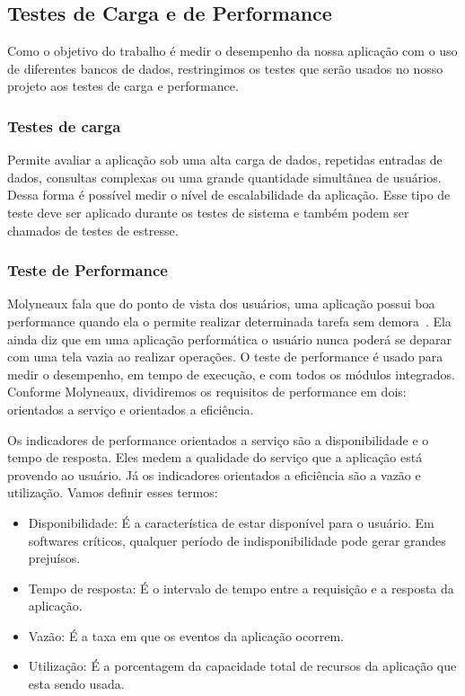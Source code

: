 \subsection{Testes de Carga e de Performance}

Como o objetivo do trabalho é medir o desempenho da nossa aplicação com o uso de diferentes bancos de dados, restringimos os testes que serão usados no nosso projeto aos testes de carga e performance.

\subsubsection{Testes de carga}

Permite avaliar a aplicação sob uma alta carga de dados, repetidas entradas de dados, consultas complexas ou uma grande quantidade simultânea de usuários. Dessa forma é possível medir o nível de escalabilidade da aplicação. Esse tipo de teste deve ser aplicado durante os testes de sistema e também podem ser chamados de testes de estresse.


\subsubsection{Teste de Performance}

Molyneaux fala que do ponto de vista dos usuários, uma aplicação possui boa performance quando ela o permite realizar determinada tarefa sem demora~\cite{theartoftestperf}. Ela ainda diz que em uma aplicação performática o usuário nunca poderá se deparar com uma tela vazia ao realizar operações. O teste de performance é usado para medir o desempenho, em tempo de execução, e com todos os módulos integrados. Conforme Molyneaux, dividiremos os requisitos de performance em dois: orientados a serviço e orientados a eficiência.

Os indicadores de performance orientados a serviço são a disponibilidade e o tempo de resposta. Eles medem a qualidade do serviço que a aplicação está provendo ao usuário. Já os indicadores orientados a eficiência são a vazão e utilização. Vamos definir esses termos:

\begin{itemize}
\item Disponibilidade: É a característica de estar disponível para o usuário. Em softwares críticos, qualquer período de indisponibilidade pode gerar grandes prejuísos.
\item Tempo de resposta: É o intervalo de tempo entre a requisição e a resposta da aplicação. 
\item Vazão: É a taxa em que os eventos da aplicação ocorrem.
\item Utilização: É a porcentagem da capacidade total de recursos da aplicação que esta sendo usada.
\end{itemize}

